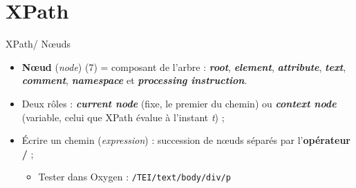 \documentclass{beamer}
\begin{document}
    \section{XPath}
    
    \begin{frame}{XPath/ N\oe uds}
        \Large
        \begin{itemize}
            \item \textbf{N\oe ud} (\textit{node}) (7) = composant de l'arbre : \textit{\textbf{root}}, \textbf{\textit{element}}, \textbf{\textit{attribute}}, \textbf{\textit{text}}, \textit{\textbf{comment}}, \textit{\textbf{namespace}} et \textit{\textbf{processing instruction}}.
            \bigskip
            \item Deux rôles : \textbf{\textit{current node}} (fixe, le premier du chemin) ou \textbf{\textit{context node}} (variable, celui que XPath évalue à l'instant \textit{t}) ;
            \bigskip
            \item Écrire un chemin (\textit{expression}) : succession de n\oe uds séparés par l'\textbf{opérateur /} ;
            \begin{itemize}
            \Large
                \item Tester dans Oxygen : \texttt{/TEI/text/body/div/p}
            \end{itemize}
        \end{itemize}
        
    \end{frame}
\end{document}
